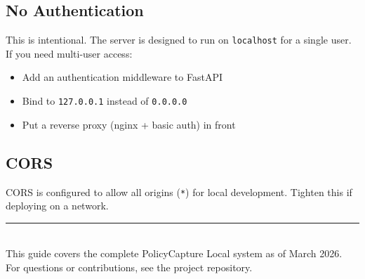 \documentclass[12pt, a4paper]{article}
\newcommand{\codeinline}[1]{\texttt{\small\colorbox{codebg}{#1}}}
\begin{document}
\subsection{No Authentication}

This is intentional. The server is designed to run on \codeinline{localhost} for a single user. If you need multi-user access:
\begin{itemize}
    \item Add an authentication middleware to FastAPI
    \item Bind to \codeinline{127.0.0.1} instead of \codeinline{0.0.0.0}
    \item Put a reverse proxy (nginx + basic auth) in front
\end{itemize}

\subsection{CORS}

CORS is configured to allow all origins (\codeinline{*}) for local development. Tighten this if deploying on a network.

\vfill
\begin{center}
\textcolor{primary}{\rule{0.6\textwidth}{1.5pt}}\\[12pt]
{\small\textcolor{commentgray}{This guide covers the complete PolicyCapture Local system as of March 2026.\\
For questions or contributions, see the project repository.}}
\end{center}
\end{document}
